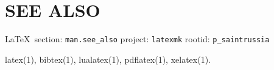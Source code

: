  
 

\section{SEE ALSO}
  
\vspace{0.5cm}
 {\ifDEBUG\small\LaTeX~section: \verb|man.see_also| project: \verb|latexmk| rootid: \verb|p_saintrussia| \fi}
\vspace{0.5cm}

latex(1), bibtex(1), lualatex(1), pdflatex(1), xelatex(1).

